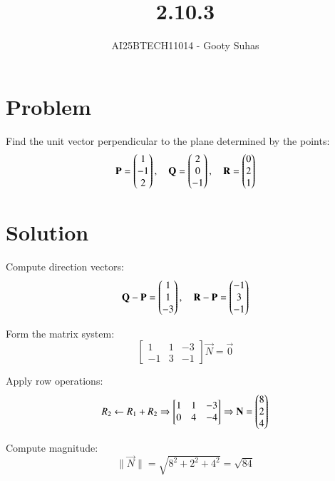 \documentclass[journal]{IEEEtran}
\begin{document}


\title{2.10.3}
\author{AI25BTECH11014 - Gooty Suhas}
{\let\newpage\relax\maketitle}

\renewcommand{\thefigure}{\theenumi}
\renewcommand{\thetable}{\theenumi}
\setlength{\intextsep}{10pt}
\renewcommand{\thetable}{\theenumi}

\section*{\large\textbf{Problem}}

Find the unit vector perpendicular to the plane determined by the points:
\[
\mathbf{P} = \begin{pmatrix}1 \\ -1 \\ 2\end{pmatrix}, \quad
\mathbf{Q} = \begin{pmatrix}2 \\ 0 \\ -1\end{pmatrix}, \quad
\mathbf{R} = \begin{pmatrix}0 \\ 2 \\ 1\end{pmatrix}
\]

\section*{\large\textbf{Solution}}

Compute direction vectors:
\[
\mathbf{Q} - \mathbf{P} = \begin{pmatrix}1 \\ 1 \\ -3\end{pmatrix}, \quad
\mathbf{R} - \mathbf{P} = \begin{pmatrix}-1 \\ 3 \\ -1\end{pmatrix}
\]

Form the matrix system:
\[
\begin{bmatrix}
1 & 1 & -3 \\
-1 & 3 & -1
\end{bmatrix}
\vec{N} = \vec{0}
\]

Apply row operations:
\[
R_2 \leftarrow R_1 + R_2 \Rightarrow
\begin{bmatrix}
1 & 1 & -3 \\
0 & 4 & -4
\end{bmatrix}
\Rightarrow \mathbf{N} = \begin{pmatrix}8 \\ 2 \\ 4\end{pmatrix}
\]

Compute magnitude:
\[
\|\vec{N}\| = \sqrt{8^2 + 2^2 + 4^2} = \sqrt{84}
\]
\end{document}
